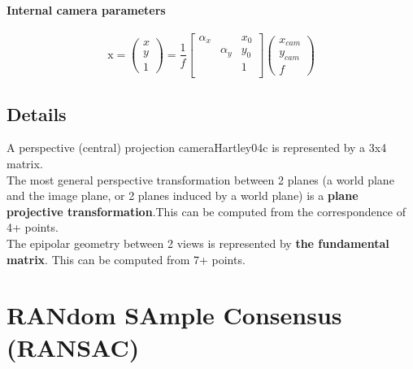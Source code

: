 \documentclass[../main.tex]{subfiles}
\begin{document}
\paragraph{Internal camera parameters}
\begin{equation}
    \textbf{$\mathrm{x}$} =
    \begin{pmatrix} x \\ y \\ 1 \end{pmatrix}
    = \frac{1}{f}
    \begin{bmatrix}
        \alpha_x &  & x_0 \\
                 & \alpha_y & y_0 \\
                 &  & 1 \\
    \end{bmatrix}
    \begin{pmatrix} x_{cam} \\ y_{cam} \\ f \end{pmatrix}
\end{equation}



\subsection{Details}
A perspective (central) projection cameraHartley04c is represented by a 3x4 matrix. \\
The most general perspective transformation between 2 planes (a world plane and the image plane, or
2 planes induced by a world plane) is a \textbf{plane projective transformation}.This can be computed from
the correspondence of 4+ points. \\
The epipolar geometry between 2 views is represented by \textbf{the fundamental matrix}. This can be computed
from 7+ points.


\section{RANdom SAmple Consensus (RANSAC)}
\end{document}
